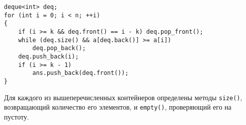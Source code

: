 \begin{verbatim}
deque<int> deq;
for (int i = 0; i < n; ++i)
{
    if (i >= k && deq.front() == i - k) deq.pop_front();
    while (deq.size() && a[deq.back()] >= a[i])
        deq.pop_back();
    deq.push_back(i);
    if (i >= k - 1)
        ans.push_back(deq.front());
}
\end{verbatim}

Для каждого из вышеперечисленных контейнеров определены методы \texttt{size()}, возвращающий количество его элементов, и \texttt{empty()}, проверяющий его на пустоту.
